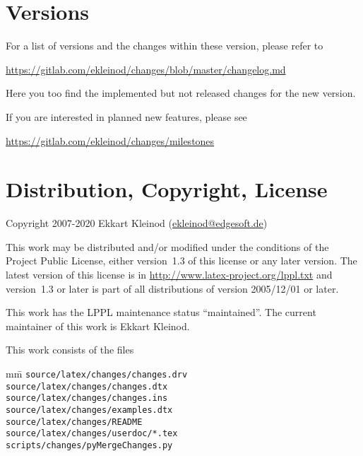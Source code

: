 \cleardoublepage
\section{Versions}
\label{sec:versions}

For a list of versions and the changes within these version, please refer to

\url{https://gitlab.com/ekleinod/changes/blob/master/changelog.md}

Here you too find the implemented but not released changes for the new version.

If you are interested in planned new features, please see

\url{https://gitlab.com/ekleinod/changes/milestones}


\cleardoublepage
\section{Distribution, Copyright, License}

Copyright 2007-2020 Ekkart Kleinod (\href{mailto:ekleinod@edgesoft.de}{ekleinod@edgesoft.de})

This work may be distributed and/or modified under the conditions of the  Project Public License, either version~1.3 of this license or any later version.
The latest version of this license is in \url{http://www.latex-project.org/lppl.txt} and version~1.3 or later is part of all distributions of  version 2005/12/01 or later.

This work has the LPPL maintenance status ``maintained''.
The current maintainer of this work is Ekkart Kleinod.

This work consists of the files

\begin{tabbing}
	mm\=\kill
	\>\texttt{source/latex/changes/changes.drv}\\
	\>\texttt{source/latex/changes/changes.dtx}\\
	\>\texttt{source/latex/changes/changes.ins}\\
	\>\texttt{source/latex/changes/examples.dtx}\\
	\>\texttt{source/latex/changes/README}\\
	\>\texttt{source/latex/changes/userdoc/*.tex}\\

	\>\texttt{scripts/changes/pyMergeChanges.py}
\end{tabbing}


